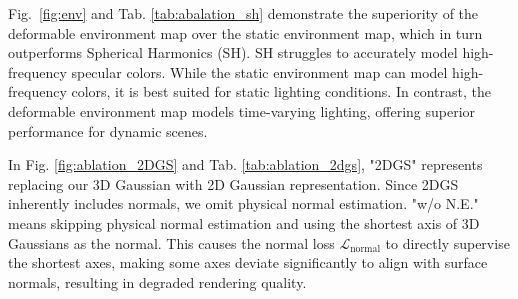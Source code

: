 \vspace{3pt}  
Fig.~\ref{fig:env} and Tab. \ref{tab:abalation_sh} demonstrate the superiority of the deformable environment map over the static environment map, which in turn outperforms Spherical Harmonics (SH). SH struggles to accurately model high-frequency specular colors. While the static environment map can model high-frequency colors, it is best suited for static lighting conditions. In contrast, the deformable environment map models time-varying lighting, offering superior performance for dynamic scenes.





\vspace{3pt}  
In Fig. \ref{fig:ablation_2DGS} and Tab. \ref{tab:ablation_2dgs}, "2DGS" represents replacing our 3D Gaussian with 2D Gaussian representation. Since 2DGS inherently includes normals, we omit physical normal estimation. "w/o N.E." means skipping physical normal estimation and using the shortest axis of 3D Gaussians as the normal. This causes the normal loss $\mathcal{L}_{\text{normal}}$ to directly supervise the shortest axes, making some axes deviate significantly to align with surface normals, resulting in degraded rendering quality.